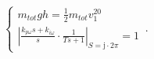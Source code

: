 \begin{equation}
    \begin{cases}
      m_{tot} g h = \frac{1}{2} m_{tot} v_1^20\\
      \left\lvert\frac{k_{p\omega}s+k_{i\omega}}{s}\cdot\frac{1}{Ts+1}\right\rvert_{S=\mathrm{j}\cdot2\pi}=1
    \end{cases}\,.
\end{equation}